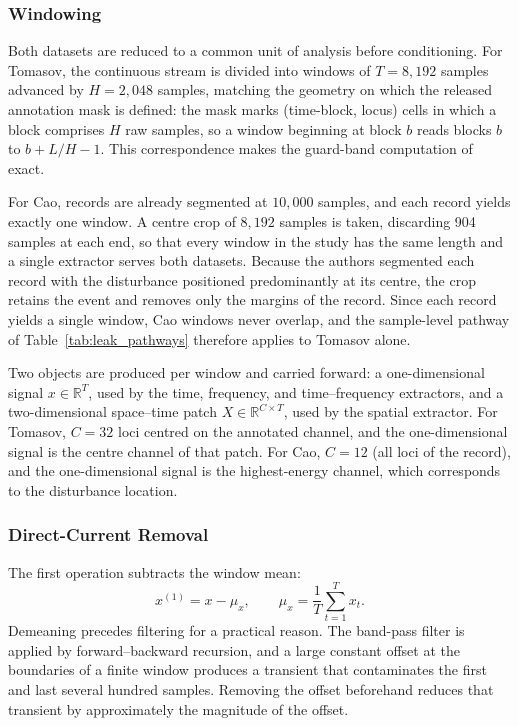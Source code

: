\subsubsection{Windowing}
\label{sec:chap3Windowing}
Both datasets are reduced to a common unit of analysis before conditioning. For Tomasov, the continuous stream is divided into windows of $T = 8{,}192$ samples advanced by $H = 2{,}048$ samples, matching the geometry on which the released annotation mask is defined: the mask marks (time-block, locus) cells in which a block comprises $H$ raw samples, so a window beginning at block $b$ reads blocks $b$ to $b + L/H - 1$. This correspondence makes the guard-band computation of  exact.

For Cao, records are already segmented at $10{,}000$ samples, and each record yields exactly one window. A centre crop of $8{,}192$ samples is taken, discarding 904 samples at each end, so that every window in the study has the same length and a single extractor serves both datasets. Because the authors segmented each record with the disturbance positioned predominantly at its centre, the crop retains the event and removes only the margins of the record. Since each record yields a single window, Cao windows never overlap, and the sample-level pathway of Table~\ref{tab:leak_pathways} therefore applies to Tomasov alone.

Two objects are produced per window and carried forward: a one-dimensional signal $x \in \mathbb{R}^{T}$, used by the time, frequency, and time--frequency extractors, and a two-dimensional space--time patch $X \in \mathbb{R}^{C \times T}$, used by the spatial extractor. For Tomasov, $C = 32$ loci centred on the annotated channel, and the one-dimensional signal is the centre channel of that patch. For Cao, $C = 12$ (all loci of the record), and the one-dimensional signal is the highest-energy channel, which corresponds to the disturbance location.

\subsubsection{Direct-Current Removal}
\label{sec:chap3DCRemoval}
The first operation subtracts the window mean:
\begin{equation}
	x^{(1)} = x - \mu_x, \qquad \mu_x = \frac{1}{T}\sum_{t=1}^{T} x_t .
	\label{eq:dcremoval}
\end{equation}
Demeaning precedes filtering for a practical reason. The band-pass filter is applied by forward--backward recursion, and a large constant offset at the boundaries of a finite window produces a transient that contaminates the first and last several hundred samples. Removing the offset beforehand reduces that transient by approximately the magnitude of the offset.


